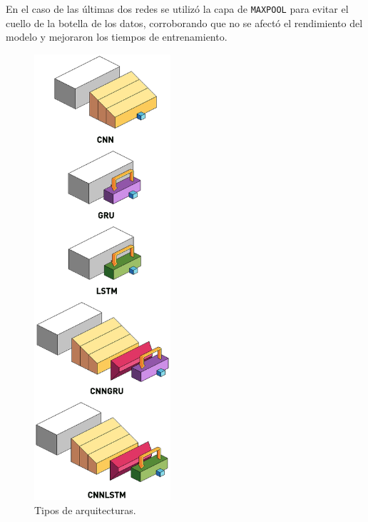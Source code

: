\documentclass[a4paper,12pt]{article}
\begin{document}
En el caso de las últimas dos redes se utilizó la capa de \texttt{MAXPOOL} para evitar el cuello de la botella de los datos, corroborando que no se afectó el rendimiento del modelo y mejoraron los tiempos de entrenamiento.

\begin{figure}[H]
	\begin{center}
	\includegraphics[width=0.45\textwidth]{layers.eps}
  	\caption{Tipos de arquitecturas.}
  	\label{fig:arch_types}
  	\end{center}
\end{figure}

\end{document}
